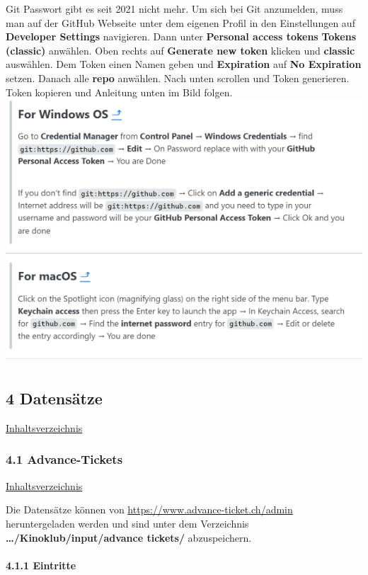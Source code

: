 \documentclass[
]{article}
\begin{document}
Git Passwort gibt es seit 2021 nicht mehr. Um sich bei Git anzumelden,
muss man auf der GitHub Webseite unter dem eigenen Profil in den
Einstellungen auf \textbf{Developer Settings} navigieren. Dann unter
\textbf{Personal access tokens} \textbf{Tokens (classic)} anwählen. Oben
rechts auf \textbf{Generate new token} klicken und \textbf{classic}
auswählen. Dem Token einen Namen geben und \textbf{Expiration} auf
\textbf{No Expiration} setzen. Danach alle \textbf{repo} anwählen. Nach
unten scrollen und Token generieren. Token kopieren und Anleitung unten
im Bild folgen.\\
\includegraphics{doc/PAT.png}

\newpage

\subsection{4 Datensätze}\label{datensuxe4tze}

\hyperref[Inhaltsverzeichnis]{Inhaltsverzeichnis}

\subsubsection{4.1 Advance-Tickets}\label{advance-tickets}

\hyperref[Inhaltsverzeichnis]{Inhaltsverzeichnis}

Die Datensätze können von \url{https://www.advance-ticket.ch/admin}
heruntergeladen werden und sind unter dem Verzeichnis
\textbf{\ldots/Kinoklub/input/advance tickets/} abzuspeichern.

\paragraph{4.1.1 Eintritte}\label{eintritte}
\end{document}
